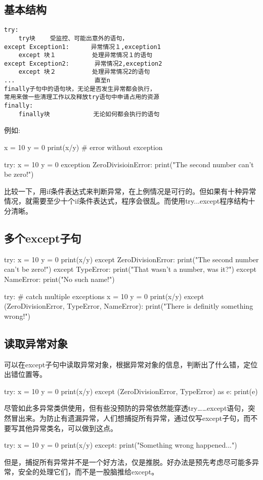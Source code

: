 \subsection{基本结构}
\begin{framed}
\begin{verbatim}
try:
    try块    受监控、可能出意外的语句，
except Exception1:　　　 异常情况１,exception1
    except 块１          处理异常情况１的语句
except Exception2:       异常情况2,exception2
    except 块２          处理异常情况2的语句
...                      直至n
finally子句中的语句块，无论是否发生异常都会执行，
常用来做一些清理工作以及释放try语句中申请占用的资源
finally:
    finally块            无论如何都会执行的语句
\end{verbatim}
\end{framed}
例如:
\begin{python}
x  = 10
y = 0
print(x/y) # error without exception

try:
    x = 10
    y = 0
exception ZeroDivisioinError:
    print("The second number can't be zero!")
\end{python}
比较一下，用if条件表达式来判断异常，在上例情况是可行的。但如果有十种异常情况，就需要至少十个if条件表达式，程序会很乱。而使用try...except程序结构十分清晰。
\subsection{多个except子句}
\begin{python}
try:
    x = 10
    y = 0
    print(x/y)
except ZeroDivisionError:
    print("The second number can't be zero!")
except TypeError:
    print("That wasn't a number, was it?")
except NameError:
    print("No such name!")

try:  # catch multiple exceptions
    x = 10
    y = 0
    print(x/y)
except (ZeroDivisionError, TypeError, NameError):
    print("There is definitly something wrong!")
\end{python}
\subsection{读取异常对象}
可以在except子句中读取异常对象，根据异常对象的信息，判断出了什么错，定位出错位置等。
\begin{python}
try:
    x = 10
    y = 0
    print(x/y)
except (ZeroDivisionError, TypeError) as e:
    print(e)
\end{python}
尽管如此多异常类供使用，但有些没预防的异常依然能穿透try……except语句，突然冒出来。为防止有遗漏异常，人们想捕捉所有异常，通过仅写except子句，而不要写其他异常类名，可以做到这点。
\begin{python}
try:
    x = 10
    y = 0
    print(x/y)
except:
    print("Something wrong happened...")
\end{python}
但是，捕捉所有异常并不是一个好方法，仅是推脱。好办法是预先考虑尽可能多异常，安全的处理它们，而不是一股脑推给except。
